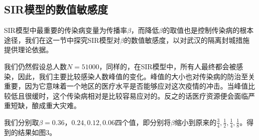 \documentclass[UTF8]{ctexart}
\begin{document}
		\subsection{SIR模型的数值敏感度}
			SIR模型中最重要的传染病变量为传播率$\beta$，而降低$\beta$的取值也是控制传染病的根本途径，我们在这一节中探究SIR模型对$\beta$的数值敏感度，以对武汉的隔离封城措施提供理论依据。
			
			我们仍然假设总人数$N=51000$，同样的，在SIR模型中，所有人最终都会被感染，因此，我们主要比较感染人数峰值的变化。峰值的大小也对传染病的防治至关重要，因为它意味着一个地区的医疗水平是否能够应对这次疫情的冲击。当峰值比较低且很缓时，这个传染病相对是比较容易应对的。反之的话医疗资源便会面临严重短缺，酿成重大灾难。
			
			我们分别取$\beta = 0.36，0.24, 0.12, 0.06$四个值，即分别将$\beta$缩小到原来的$\frac34, \frac 12 ,\frac14 ,\frac18$。得到的结果如图3。
			
\end{document}
